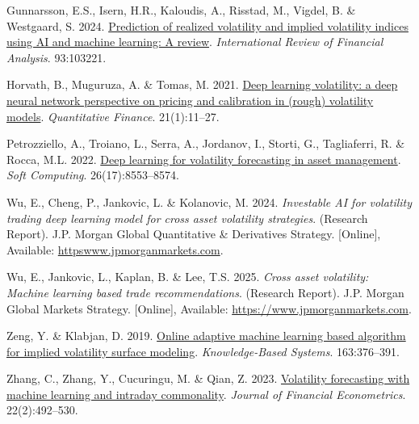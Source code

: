 \documentclass[11pt,preprint]{elsarticle}
\numberwithin{equation}{section}
\numberwithin{figure}{section}
\numberwithin{table}{section}
\newlength{\cslhangindent}
\newenvironment{CSLReferences}[2] %
{\begin{list}{}{%
	\setlength{\itemindent}{0pt}
	\setlength{\leftmargin}{0pt}
	\setlength{\parsep}{0pt}
	\ifodd #1
	\setlength{\leftmargin}{\cslhangindent}
	\setlength{\itemindent}{-1\cslhangindent}
	\fi
	\setlength{\itemsep}{#2\baselineskip}}}
{\end{list}}
\begin{document}
\label{refs}
\begin{CSLReferences}{1}{1}
Gunnarsson, E.S., Isern, H.R., Kaloudis, A., Risstad, M., Vigdel, B. \&
Westgaard, S. 2024.
\href{https://doi.org/10.1016/j.irfa.2024.103221}{Prediction of realized
volatility and implied volatility indices using AI and machine learning:
A review}. \emph{International Review of Financial Analysis}. 93:103221.

Horvath, B., Muguruza, A. \& Tomas, M. 2021.
\href{https://doi.org/10.1080/14697688.2020.1817974}{{Deep learning
volatility: a deep neural network perspective on pricing and calibration
in (rough) volatility models}}. \emph{Quantitative Finance}.
21(1):11--27.

Petrozziello, A., Troiano, L., Serra, A., Jordanov, I., Storti, G.,
Tagliaferri, R. \& Rocca, M.L. 2022.
\href{https://doi.org/10.1007/s00500-022-07161-1}{Deep learning for
volatility forecasting in asset management}. \emph{Soft Computing}.
26(17):8553--8574.

Wu, E., Cheng, P., Jankovic, L. \& Kolanovic, M. 2024. \emph{Investable
AI for volatility trading deep learning model for cross asset volatility
strategies}. (Research Report). J.P. Morgan Global Quantitative \&
Derivatives Strategy. {[}Online{]}, Available:
\href{https://httpswww.jpmorganmarkets.com}{httpswww.jpmorganmarkets.com}.

Wu, E., Jankovic, L., Kaplan, B. \& Lee, T.S. 2025. \emph{Cross asset
volatility: Machine learning based trade recommendations}. (Research
Report). J.P. Morgan Global Markets Strategy. {[}Online{]}, Available:
\url{https://www.jpmorganmarkets.com}.

Zeng, Y. \& Klabjan, D. 2019.
\href{https://doi.org/10.1016/j.knosys.2018.08.039}{Online adaptive
machine learning based algorithm for implied volatility surface
modeling}. \emph{Knowledge-Based Systems}. 163:376--391.

Zhang, C., Zhang, Y., Cucuringu, M. \& Qian, Z. 2023.
\href{https://doi.org/10.1093/jjfinec/nbad005}{Volatility forecasting
with machine learning and intraday commonality}. \emph{Journal of
Financial Econometrics}. 22(2):492--530.

\end{CSLReferences}


\end{document}
